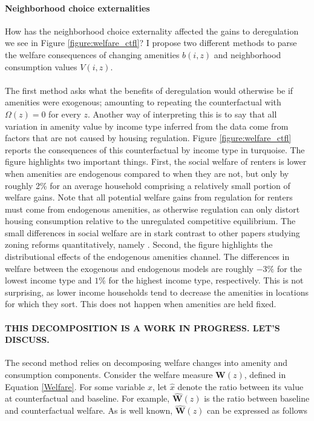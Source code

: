 \documentclass[11pt]{article}
\begin{document}
\paragraph*{Neighborhood choice externalities} 
How has the neighborhood choice externality affected the gains to deregulation we see in Figure \ref{figure:welfare_ctfl}? I propose two different methods to parse the welfare consequences of changing amenities $b(i, z)$ and neighborhood consumption values $V(i, z)$. 
\paragraph*{}
The first method asks what the benefits of deregulation would otherwise be if amenities were exogenous; amounting to repeating the counterfactual with $\Omega(z) = 0$ for every $z$. Another way of interpreting this is to say that all variation in amenity value by income type inferred from the data come from factors that are not caused by housing regulation. Figure \ref{figure:welfare_ctfl} reports the consequences of this counterfactual by income type in turquoise. The figure highlights two important things. First, the social welfare of renters is lower when amenities are endogenous compared to when they are not, but only by roughly 2\% for an average household comprising a relatively small portion of welfare gains. Note that all potential welfare gains from regulation for renters must come from endogenous amenities, as otherwise regulation can only distort housing consumption relative to the unregulated competitive equilibrium. The small differences in social welfare are in stark contrast to other papers studying zoning reforms quantitatively, namely \cite{calabresetal}. Second, the figure highlights the distributional effects of the endogenous amenities channel. The differences in welfare between the exogenous and endogenous models are roughly $-3\%$ for the lowest income type and $1\%$ for the highest income type, respectively. This is not surprising, as lower income households tend to decrease the amenities in locations for which they sort. This does not happen when amenities are held fixed.  

\paragraph*{THIS DECOMPOSITION IS A WORK IN PROGRESS. LET'S DISCUSS.}
The second method relies on decomposing welfare changes into amenity and consumption components. Consider the welfare measure $\boldsymbol{W}(z)$, defined in Equation \eqref{Welfare}. For some variable $x$, let $\hat{x}$ denote the ratio between its value at counterfactual and baseline. For example, $\hat{\boldsymbol{W}}(z)$ is the ratio between baseline and counterfactual welfare. As is well known, $\hat{\boldsymbol{W}}(z)$ can be expressed as follows
\end{document}

